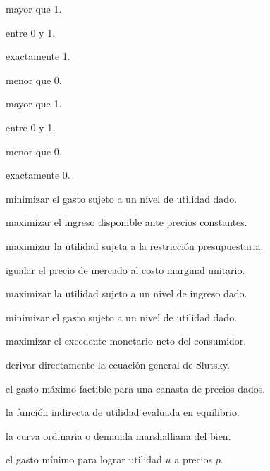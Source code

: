 \begin{opts}
    \item mayor que 1.
    \item entre 0 y 1.
    \item exactamente 1.
    \item menor que 0.
\end{opts}

\begin{opts}
    \item mayor que 1.
    \item entre 0 y 1.
    \item menor que 0.
    \item exactamente 0.
\end{opts}

\begin{opts}
    \item minimizar el gasto sujeto a un nivel de utilidad dado.
    \item maximizar el ingreso disponible ante precios constantes.
    \item maximizar la utilidad sujeta a la restricción presupuestaria.
    \item igualar el precio de mercado al costo marginal unitario.
\end{opts}

\begin{opts}
    \item maximizar la utilidad sujeto a un nivel de ingreso dado.
    \item minimizar el gasto sujeto a un nivel de utilidad dado.
    \item maximizar el excedente monetario neto del consumidor.
    \item derivar directamente la ecuación general de Slutsky.
\end{opts}

\begin{opts}
    \item el gasto máximo factible para una canasta de precios dados.
    \item la función indirecta de utilidad evaluada en equilibrio.
    \item la curva ordinaria o demanda marshalliana del bien.
    \item el gasto mínimo para lograr utilidad $u$ a precios $p$.
\end{opts}

